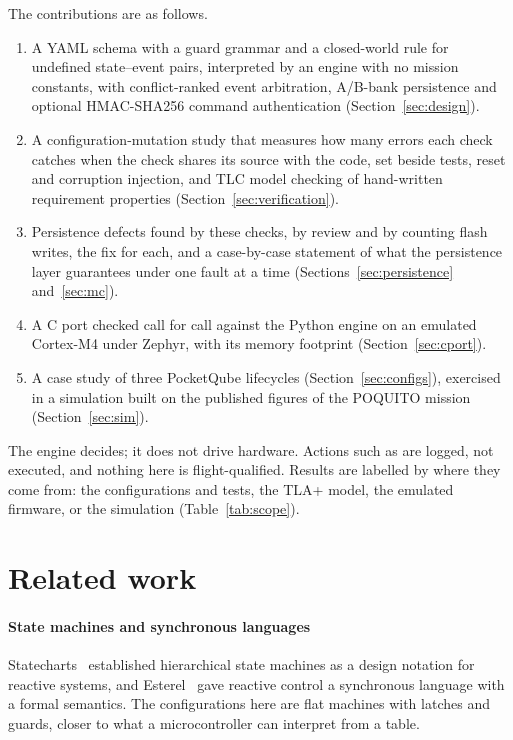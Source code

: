 \documentclass[preprint,12pt]{elsarticle}
\begin{document}
The contributions are as follows.
\begin{enumerate}
\item A YAML schema with a guard grammar and a closed-world rule for undefined state--event pairs, interpreted by an engine with no mission constants, with conflict-ranked event arbitration, A/B-bank persistence and optional HMAC-SHA256 command authentication (Section~\ref{sec:design}).
\item A configuration-mutation study that measures how many errors each check catches when the check shares its source with the code, set beside tests, reset and corruption injection, and TLC model checking of hand-written requirement properties (Section~\ref{sec:verification}).
\item Persistence defects found by these checks, by review and by counting flash writes, the fix for each, and a case-by-case statement of what the persistence layer guarantees under one fault at a time (Sections~\ref{sec:persistence} and~\ref{sec:mc}).
\item A C port checked call for call against the Python engine on an emulated Cortex-M4 under Zephyr, with its memory footprint (Section~\ref{sec:cport}).
\item A case study of three PocketQube lifecycles (Section~\ref{sec:configs}), exercised in a simulation built on the published figures of the POQUITO mission (Section~\ref{sec:sim}).
\end{enumerate}

The engine decides; it does not drive hardware. Actions such as  are logged, not executed, and nothing here is flight-qualified. Results are labelled by where they come from: the configurations and tests, the TLA+ model, the emulated firmware, or the simulation (Table~\ref{tab:scope}).

\section{Related work}\label{sec:related}

\paragraph{State machines and synchronous languages} Statecharts~\cite{Harel1987Statecharts} established hierarchical state machines as a design notation for reactive systems, and Esterel~\cite{Berry1992Esterel} gave reactive control a synchronous language with a formal semantics. The configurations here are flat machines with latches and guards, closer to what a microcontroller can interpret from a table.
\end{document}
